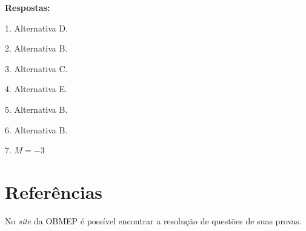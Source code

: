 \documentclass[a4paper, 12pt]{article}
\begin{document}
\noindent \textbf{Respostas:}
\begin{flushleft}
1. Alternativa D.

2. Alternativa B.

3. Alternativa C.

4. Alternativa E.

5. Alternativa B.

6. Alternativa B.

7. \(M = -3\)

\end{flushleft}




%
%

\section{Referências}

\noindent No \textit{site} da OBMEP é possível encontrar a resolução de questões de suas provas.
\end{document}
